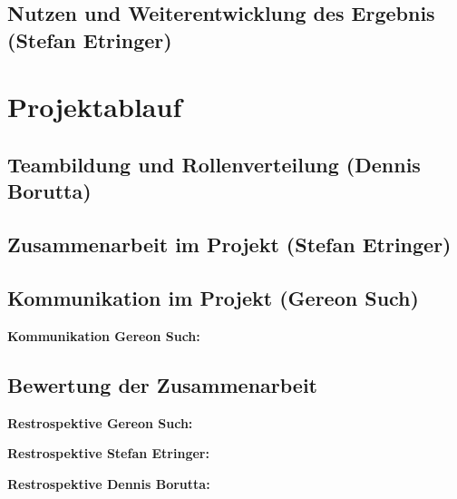 \documentclass[
  a4paper,
  12pt,
  DIV=12,        %
  parskip=half,  %
  headings=small %
]{scrartcl}
\theoremstyle{definition}
\theoremstyle{definition}
\renewcommand{\cbstart}[1][]{}
\renewcommand{\cbend}{}
\renewcommand{\cbcolor}[1]{}
\begin{document}
\subsection{Nutzen und Weiterentwicklung des Ergebnis (Stefan Etringer)}\label{nutzen-des-aktuellen-ergebnis}

\cbcolor{green}
\cbstart

\cbend

\section{Projektablauf}\label{projektablauf}

\subsection{Teambildung und Rollenverteilung (Dennis Borutta)}\label{teambildung-und-rollenverteilung}

\cbcolor{blue}
\cbstart

\cbend

\subsection{Zusammenarbeit im Projekt (Stefan Etringer)}\label{zusammenarbeit-projekt}

\cbcolor{green}
\cbstart

\cbend

\subsection{Kommunikation im Projekt (Gereon Such)}\label{kommunikation-projekt}

\textbf{Kommunikation Gereon Such:}

\cbcolor{red}
\cbstart

\cbend

\subsection{Bewertung der Zusammenarbeit}\label{bewertung-der-zusammenarbeit}


\textbf{Restrospektive Gereon Such:}

\cbcolor{red}
\cbstart

\cbend

\textbf{Restrospektive Stefan Etringer:}

\cbcolor{green}
\cbstart

\cbend

\textbf{Restrospektive Dennis Borutta:}
\end{document}
